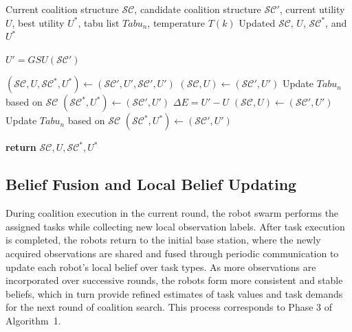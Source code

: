 \documentclass[journal,twoside,web]{ieeecolor}
\begin{document}
\begin{algorithm}[!t]
\caption{Tabu and Simulated Annealing-Based Acceptance Rule}
\label{alg:acceptance_rule}
\begin{algorithmic}[1]
\REQUIRE Current coalition structure $\mathcal{SC}$, candidate coalition structure $\mathcal{SC}'$, current utility $U$, best utility $U^*$, tabu list $\mathit{Tabu}_n$, temperature $T(k)$
\ENSURE Updated $\mathcal{SC}$, $U$, $\mathcal{SC}^*$, and $U^*$

\STATE $U' = GSU(\mathcal{SC}')$

        \STATE $(\mathcal{SC}, U, \mathcal{SC}^*, U^*) \leftarrow (\mathcal{SC}', U', \mathcal{SC}', U')$
    \ENDIF
{}
    \STATE $(\mathcal{SC}, U) \leftarrow (\mathcal{SC}', U')$
    \STATE Update $\mathit{Tabu}_n$ based on $\mathcal{SC}$
        \STATE $(\mathcal{SC}^*, U^*) \leftarrow (\mathcal{SC}', U')$
    \ENDIF
\ELSE
    \STATE $\Delta E = U' - U$
        \STATE $(\mathcal{SC}, U) \leftarrow (\mathcal{SC}', U')$
        \STATE Update $\mathit{Tabu}_n$ based on $\mathcal{SC}$
            \STATE $(\mathcal{SC}^*, U^*) \leftarrow (\mathcal{SC}', U')$
        \ENDIF
    \ENDIF
\ENDIF

\STATE \textbf{return} $\mathcal{SC}, U, \mathcal{SC}^*, U^*$
\end{algorithmic}
\end{algorithm}







\subsection{Belief Fusion and Local Belief Updating}

During coalition execution in the current round, the robot swarm performs the assigned tasks while collecting new local observation labels. After task execution is completed, the robots return to the initial base station, where the newly acquired observations are shared and fused through periodic communication to update each robot's local belief over task types. As more observations are incorporated over successive rounds, the robots form more consistent and stable beliefs, which in turn provide refined estimates of task values and task demands for the next round of coalition search. This process corresponds to Phase 3 of Algorithm~1.
\end{document}
